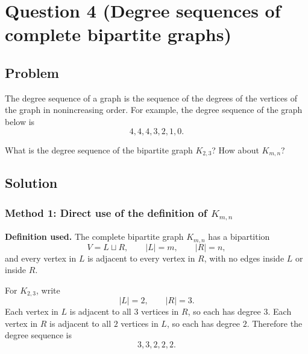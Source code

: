 \documentclass[12pt]{article}
\begin{document}
\newpage
\section{Question 4 (Degree sequences of complete bipartite graphs)}

\subsection{Problem}
The degree sequence of a graph is the sequence of the degrees of the vertices of the graph in nonincreasing order. For example, the degree sequence of the graph below is
\[
4,4,4,3,2,1,0.
\]

\begin{center}
\end{center}

\noindent
What is the degree sequence of the bipartite graph $K_{2,3}$? How about $K_{m,n}$?

\subsection{Solution}

\subsubsection{Method 1: Direct use of the definition of $K_{m,n}$}
\textbf{Definition used.} The complete bipartite graph $K_{m,n}$ has a bipartition
\[
V=L\sqcup R,
\qquad |L|=m,
\qquad |R|=n,
\]
and every vertex in $L$ is adjacent to every vertex in $R$, with no edges inside $L$ or inside $R$.

For $K_{2,3}$, write
\[
|L|=2,
\qquad |R|=3.
\]
Each vertex in $L$ is adjacent to all $3$ vertices in $R$, so each has degree $3$. Each vertex in $R$ is adjacent to all $2$ vertices in $L$, so each has degree $2$. Therefore the degree sequence is
\[
\boxed{3,3,2,2,2.}
\]
\end{document}
